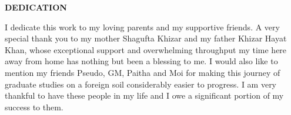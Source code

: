 \thispagestyle{empty}

\begin{center}
\textbf{DEDICATION}
\end{center}

\smallskip

I dedicate this work to my loving parents and my supportive friends. A very special thank you to my 
mother Shagufta Khizar and my father Khizar Hayat Khan, whose exceptional support and overwhelming 
throughput my time here away from home has nothing but been a blessing to me. I would also like to 
mention my friends Pseudo, GM, Paitha and Moi for making this journey of graduate studies on a 
foreign soil considerably easier to progress. I am very thankful to have these people in my life 
and I owe a significant portion of my success to them.



